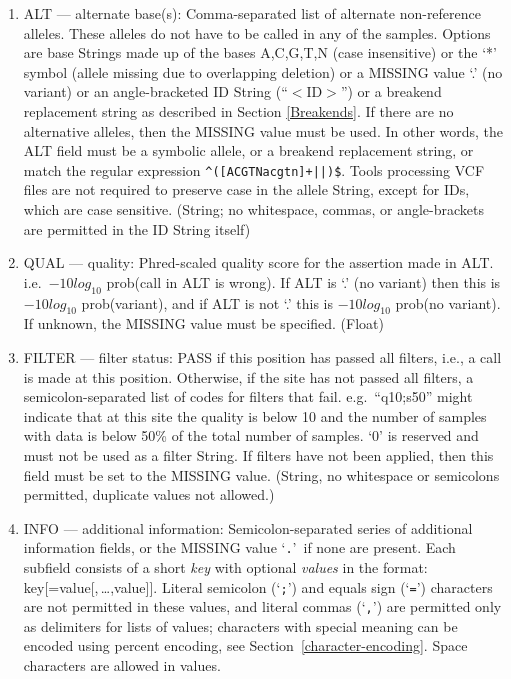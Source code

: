 \documentclass[8pt]{article}
\begin{document}
\begin{enumerate}
  \item ALT --- alternate base(s): Comma-separated list of alternate non-reference alleles.
  These alleles do not have to be called in any of the samples.
  Options are base Strings made up of the bases A,C,G,T,N (case insensitive) or the `*' symbol (allele missing due to overlapping deletion) or a MISSING value `.' (no variant) or an angle-bracketed ID String (``$<$ID$>$'') or a breakend replacement string as described in Section \ref{Breakends}.
  If there are no alternative alleles, then the MISSING value must be used.
  In other words, the ALT field must be a symbolic allele, or a breakend replacement string, or match the regular expression \texttt{\^{}([ACGTNacgtn]+|\string\*|\string\.)\$}.
  Tools processing VCF files are not required to preserve case in the allele String, except for IDs, which are case sensitive.
  (String; no whitespace, commas, or angle-brackets are permitted in the ID String itself)
  \item QUAL --- quality: Phred-scaled quality score for the assertion made in ALT. i.e.\ $-10log_{10}$ prob(call in ALT is wrong).
  If ALT is `.' (no variant) then this is $-10log_{10}$ prob(variant), and if ALT is not `.' this is $-10log_{10}$ prob(no variant).
  If unknown, the MISSING value must be specified. (Float)
  \item FILTER --- filter status: PASS if this position has passed all filters, i.e., a call is made at this position.
  Otherwise, if the site has not passed all filters, a semicolon-separated list of codes for filters that fail. e.g.\ ``q10;s50'' might indicate that at this site the quality is below 10 and the number of samples with data is below 50\% of the total number of samples.
  `0' is reserved and must not be used as a filter String.
  If filters have not been applied, then this field must be set to the MISSING value.
  (String, no whitespace or semicolons permitted, duplicate values not allowed.)
  \item INFO --- additional information: Semicolon-separated series of additional information fields, or the MISSING value `{\tt .}'\ if none are present.
  Each subfield consists of a short \emph{key} with optional \emph{values} in the format: key[=value[,\,\ldots,value]].
  Literal semicolon (`{\tt ;}') and equals sign (`{\tt =}') characters are not permitted in these values, and literal commas (`{\tt ,}') are permitted only as delimiters for lists of values; characters with special meaning can be encoded using percent encoding, see Section~\ref{character-encoding}.
  Space characters are allowed in values.


\end{enumerate}
\end{document}
